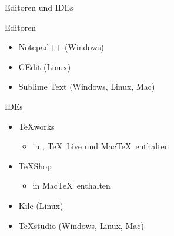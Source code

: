 \begin{Frame}{Editoren und IDEs}
  \begin{Block}{Editoren}
    \begin{itemize}
      \item Notepad++ (Windows)
      \item GEdit (Linux)
      \item Sublime Text (Windows, Linux, Mac)
    \end{itemize}
  \end{Block}

  \pause

  \begin{Block}{IDEs}
    \begin{itemize}
      \item \TeX works
        \begin{itemize}
          \item in \MiKTeX, \TeX\ Live und Mac\TeX\ enthalten
        \end{itemize}
      \item \TeX Shop
        \begin{itemize}
          \item in Mac\TeX\ enthalten
        \end{itemize}
      \item Kile (Linux)
      \item TeXstudio (Windows, Linux, Mac)
    \end{itemize}
  \end{Block}
\end{Frame}

